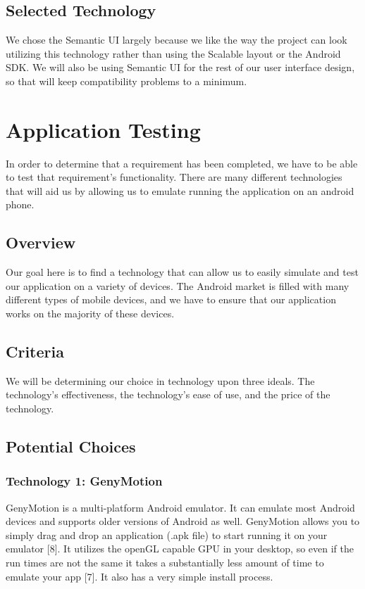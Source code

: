 \documentclass{scrreprt}
\begin{document}
\section{Selected Technology}
We chose the Semantic UI largely because we like the way the project can look utilizing this technology rather than using the Scalable layout or the Android SDK. We will also be using Semantic UI for the rest of our user interface design, so that will keep compatibility problems to a minimum.

\chapter{Application Testing} %
In order to determine that a requirement has been completed, we have to be able to test that requirement’s functionality. There are many different technologies that will aid us by allowing us to emulate running the application on an android phone. 
\section{Overview}
Our goal here is to find a technology that can allow us to easily simulate and test our application on a variety of devices. The Android market is filled with many different types of mobile devices, and we have to ensure that our application works on the majority of these devices.

\section{Criteria}
We will be determining our choice in technology upon three ideals. The technology’s effectiveness, the technology’s ease of use, and the price of the technology. 

\section{Potential Choices}
\subsection{Technology 1: GenyMotion}
GenyMotion is a multi-platform Android emulator. It can emulate most Android devices and
supports older versions of Android as well. GenyMotion allows you to simply drag and drop an
application (.apk file) to start running it on your emulator [8]. It utilizes the openGL
capable GPU in your desktop, so even if the run times are not the same it takes a substantially
less amount of time to emulate your app [7]. It also has a very simple install process. 
\end{document}
